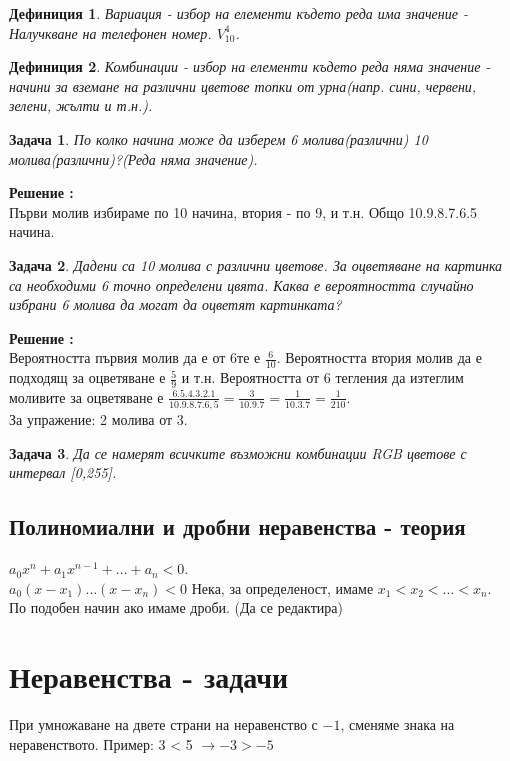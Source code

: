 \documentclass{article}
\newtheorem{definition}{Дефиниция}
\newtheorem{problem}{Задача}
\newcounter{solution}
\newcommand\solution{%
	\stepcounter{solution}%
	\textbf{Решение :}\\%
}
\begin{document}
\begin{definition}
Вариация - избор на елементи където реда има значение - Налучкване на телефонен номер. $V_{10}^4$.
\end{definition}


\begin{definition}
	Комбинации - избор на елементи където реда няма значение - начини за вземане на различни цветове топки от урна(напр. сини, червени, зелени, жълти и т.н.).
\end{definition}

\begin{problem}
По колко начина може да изберем 6 молива(различни) 10 молива(различни)?(Реда няма значение).
\end{problem}
\solution Първи молив избираме по 10 начина, втория - по 9, и т.н. Общо 10.9.8.7.6.5 начина.



\begin{problem}
	Дадени са 10 молива с различни цветове. За оцветяване на картинка са необходими 6 точно определени цвята. Каква е вероятността случайно избрани 6 молива да могат да оцветят картинката?
\end{problem}
\solution
Вероятността първия молив да е от 6те е $\frac{6}{10}$. Вероятността втория молив да е подходящ за оцветяване е  $\frac{5}{9}$ и т.н. Вероятността от 6 тегления да изтеглим моливите за оцветяване е $\frac{6.5.4.3.2.1}{10.9.8.7.6,5} = \frac{3}{10.9.7} = \frac{1}{10.3.7} = \frac{1}{210}$. \\
За упражение: 2 молива от 3.



\begin{problem}
	Да се намерят всичките възможни комбинации RGB цветове с интервал [0,255].
\end{problem}

\subsection{Полиномиални и дробни неравенства - теория}
$a_0 x^n + a_1 x^{n-1} + \dots  + a_n < 0$. \\
$a_0(x-x_1)\dots (x-x_n) < 0$
Нека, за определеност, имаме $x_1 < x_2 < \dots < x_n $. По подобен начин ако имаме дроби. (Да се редактира)

	\section{Неравенства - задачи}
	При умножаване на двете страни на неравенство с $-1$, сменяме знака на неравенството. Пример:
	 3 < 5  $ \to -3>-5 $ \\
	 
\end{document}
